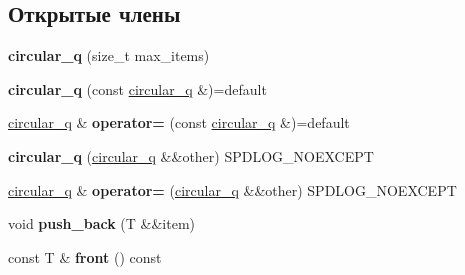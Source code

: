 \subsection*{Открытые члены}
\begin{DoxyCompactItemize}
\item 
\mbox{\label{classspdlog_1_1details_1_1circular__q_ab0aae072dd38824fee65ed9d48568c2f}} 
{\bfseries circular\+\_\+q} (size\+\_\+t max\+\_\+items)
\item 
\mbox{\label{classspdlog_1_1details_1_1circular__q_af87f2c922f7975f514a4709c94a31c98}} 
{\bfseries circular\+\_\+q} (const \hyperlink{classspdlog_1_1details_1_1circular__q}{circular\+\_\+q} \&)=default
\item 
\mbox{\label{classspdlog_1_1details_1_1circular__q_a63739e2cfcf6d5f03e766b067e187fbc}} 
\hyperlink{classspdlog_1_1details_1_1circular__q}{circular\+\_\+q} \& {\bfseries operator=} (const \hyperlink{classspdlog_1_1details_1_1circular__q}{circular\+\_\+q} \&)=default
\item 
\mbox{\label{classspdlog_1_1details_1_1circular__q_aa8e4771c5e8f034d8e6641dbcf5a3252}} 
{\bfseries circular\+\_\+q} (\hyperlink{classspdlog_1_1details_1_1circular__q}{circular\+\_\+q} \&\&other) S\+P\+D\+L\+O\+G\+\_\+\+N\+O\+E\+X\+C\+E\+PT
\item 
\mbox{\label{classspdlog_1_1details_1_1circular__q_a432122f59344292a6140403233061f7b}} 
\hyperlink{classspdlog_1_1details_1_1circular__q}{circular\+\_\+q} \& {\bfseries operator=} (\hyperlink{classspdlog_1_1details_1_1circular__q}{circular\+\_\+q} \&\&other) S\+P\+D\+L\+O\+G\+\_\+\+N\+O\+E\+X\+C\+E\+PT
\item 
\mbox{\label{classspdlog_1_1details_1_1circular__q_aaaab548bb6f5dd362458d6b044e0e950}} 
void {\bfseries push\+\_\+back} (T \&\&item)
\item 
\mbox{\label{classspdlog_1_1details_1_1circular__q_a5a67540c28eaa986205a5422a70612d4}} 
const T \& {\bfseries front} () const
\item 

\end{DoxyCompactItemize}
